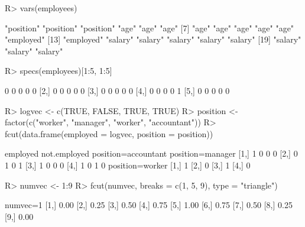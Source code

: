 \documentclass{article}\usepackage[]{graphicx}\usepackage[]{color}
\begin{document}
\begin{Schunk}
% --begin: "lcut.vars"
\begin{Sinput}
R> vars(employees)
\end{Sinput}
\begin{Soutput}
 [1] "position" "position" "position" "age"      "age"      "age"     
 [7] "age"      "age"      "age"      "age"      "age"      "employed"
[13] "employed" "salary"   "salary"   "salary"   "salary"   "salary"  
[19] "salary"   "salary"   "salary"  
\end{Soutput}
%
% --end: "lcut.vars"
\end{Schunk}

\begin{Schunk}
% --begin: "lcut.specs"
\begin{Sinput}
R> specs(employees)[1:5, 1:5]
\end{Sinput}
\begin{Soutput}
     [,1] [,2] [,3] [,4] [,5]
[1,]    0    0    0    0    0
[2,]    0    0    0    0    0
[3,]    0    0    0    0    0
[4,]    0    0    0    0    1
[5,]    0    0    0    0    0
\end{Soutput}
%
% --end: "lcut.specs"
\end{Schunk}

\begin{Schunk}
% --begin: "fcut.logfact"
\begin{Sinput}
R> logvec <- c(TRUE, FALSE, TRUE, TRUE)
R> position <- factor(c("worker", "manager", "worker", "accountant"))
R> fcut(data.frame(employed = logvec, position = position))
\end{Sinput}
\begin{Soutput}
     employed not.employed position=accountant position=manager
[1,]        1            0                   0                0
[2,]        0            1                   0                1
[3,]        1            0                   0                0
[4,]        1            0                   1                0
     position=worker
[1,]               1
[2,]               0
[3,]               1
[4,]               0
\end{Soutput}
%
% --end: "fcut.logfact"
\end{Schunk}

\begin{Schunk}
% --begin: "fcut.numeric1"
\begin{Sinput}
R> numvec <- 1:9
R> fcut(numvec, breaks = c(1, 5, 9), type = "triangle")
\end{Sinput}
\begin{Soutput}
      numvec=1
 [1,]     0.00
 [2,]     0.25
 [3,]     0.50
 [4,]     0.75
 [5,]     1.00
 [6,]     0.75
 [7,]     0.50
 [8,]     0.25
 [9,]     0.00
\end{Soutput}
%
% --end: "fcut.numeric1"
\end{Schunk}
\end{document}
